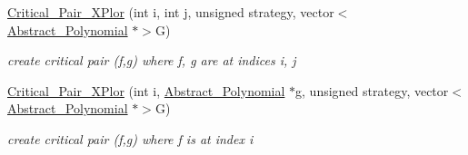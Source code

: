 \begin{Indent}
\begin{DoxyCompactItemize}
\mbox{\label{group___g_b_computation_af5d0947e70b4070f796f1b0d8ce75484}} 
\hyperlink{group___g_b_computation_af5d0947e70b4070f796f1b0d8ce75484}{Critical\+\_\+\+Pair\+\_\+\+X\+Plor} (int i, int j, unsigned strategy, vector$<$ \hyperlink{group__polygroup_class_abstract___polynomial}{Abstract\+\_\+\+Polynomial} $\ast$$>$G)
\begin{DoxyCompactList}\small\item\em create critical pair (f,g) where f, g are at indices {\ttfamily i}, {\ttfamily j} \end{DoxyCompactList}\item 
\mbox{\label{group___g_b_computation_a1cafe8e84ec3bee5e63370b7b815ba71}} 
\hyperlink{group___g_b_computation_a1cafe8e84ec3bee5e63370b7b815ba71}{Critical\+\_\+\+Pair\+\_\+\+X\+Plor} (int i, \hyperlink{group__polygroup_class_abstract___polynomial}{Abstract\+\_\+\+Polynomial} $\ast$g, unsigned strategy, vector$<$ \hyperlink{group__polygroup_class_abstract___polynomial}{Abstract\+\_\+\+Polynomial} $\ast$$>$G)
\begin{DoxyCompactList}\small\item\em create critical pair (f,g) where f is at index {\ttfamily i} \end{DoxyCompactList}\end{DoxyCompactItemize}
\end{Indent}
